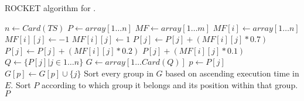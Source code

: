 \begin{algorithm}[h!]
\caption{ROCKET algorithm for \tcp{}.}
\label{alg:rocket}
\begin{algorithmic}[1]
		\State $n \gets Card(TS)$
		\State $P \gets array[1 \dots n]$ 
		\State $MF \gets array[1 \dots m]$
			\State $MF[i] \gets array[1 \dots n]$
					$MF[i][j] \gets -1$
				\Else{}
					$MF[i][j] \gets 1$
				\EndIf
			\EndFor
		\EndFor
					$P[j] \gets P[j] + (MF[i][j] * 0.7)$
					$P[j] \gets P[j] + (MF[i][j] * 0.2)$
				\Else{}
					$P[j] + (MF[i][j] * 0.1)$
				\EndIf
			\EndFor
		\EndFor
		\State $Q \gets \{P[j] \vert j \in 1 \dots n\}$ 
		\State $G \gets array[1 \dots Card(Q)]$ 
			\State $p \gets P[j]$
			\State $G[p] \gets G[p] \cup \{j\}$
		\EndFor
		\State Sort every group in $G$ based on ascending execution time in $E$.
		\State Sort $P$ according to which group it belongs and its position within that group.
		\State \Return $P$
	\EndProcedure
\end{algorithmic}
\end{algorithm}
